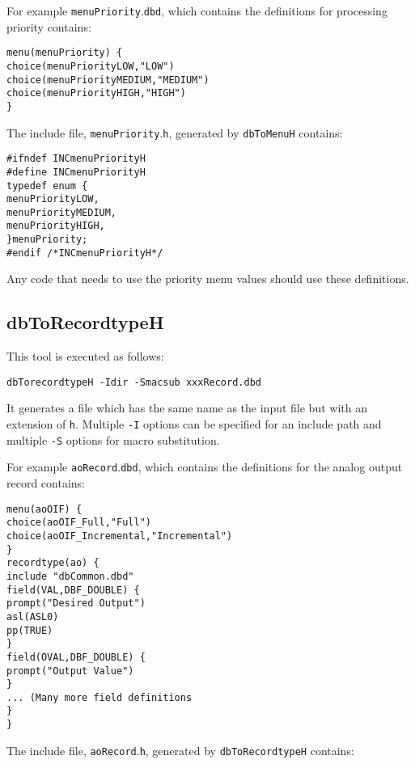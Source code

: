 For example \verb|menuPriority|.\verb|dbd|, which contains the definitions for processing priority contains:

\begin{verbatim}menu(menuPriority) {
choice(menuPriorityLOW,"LOW")
choice(menuPriorityMEDIUM,"MEDIUM")
choice(menuPriorityHIGH,"HIGH")
}
\end{verbatim}The include file, \verb|menuPriority|.\verb|h|, generated by \verb|dbToMenuH| contains:

\begin{verbatim}#ifndef INCmenuPriorityH
#define INCmenuPriorityH
typedef enum {
menuPriorityLOW,
menuPriorityMEDIUM,
menuPriorityHIGH,
}menuPriority;
#endif /*INCmenuPriorityH*/

\end{verbatim}Any code that needs to use the priority menu values should use these definitions.

\subsection{dbToRecordtypeH}

This tool is executed as follows:

\begin{verbatim}dbTorecordtypeH -Idir -Smacsub xxxRecord.dbd
\end{verbatim}It generates a file which has the same name as the input file but with an extension of \verb|h|. Multiple \verb|-I| options can be 
specified for an include path and multiple \verb|-S| options for macro substitution.

For example \verb|aoRecord|.\verb|dbd|, which contains the definitions for the analog output record contains:

\begin{verbatim}menu(aoOIF) {
choice(aoOIF_Full,"Full")
choice(aoOIF_Incremental,"Incremental")
}
recordtype(ao) {
include "dbCommon.dbd"
field(VAL,DBF_DOUBLE) {
prompt("Desired Output")
asl(ASL0)
pp(TRUE)
}
field(OVAL,DBF_DOUBLE) {
prompt("Output Value")
}
... (Many more field definitions
}
}
\end{verbatim}The include file, \verb|aoRecord|.\verb|h|, generated by \verb|dbToRecordtypeH| contains:


